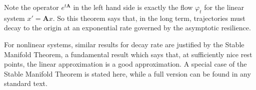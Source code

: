 
%	

Note the operator $e^{t\mathbf{A}}$ in the left hand side is exactly the flow $\varphi_t$ for the linear system $x' = \mathbf{A}x$. So this theorem says that, in the long term, trajectories must decay to the origin at an exponential rate governed by the asymptotic resilience. 

%



For nonlinear systems, similar results for decay rate are justified by the Stable Manifold Theorem, a fundamental result which says that, at sufficiently nice rest points, the linear approximation is a good approximation. 
%
%
%
A special case of the Stable Manifold Theorem is stated here, while a full version can be found in any standard text. %

